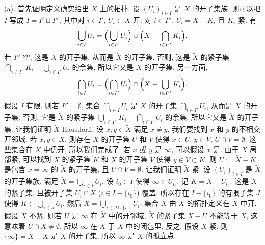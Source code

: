 \begin{exercise}[$\mathcal{C}(X)$ 的谱]
\begin{solution}
(a). 首先证明定义确实给出 $\tilde{X}$ 上的拓扑. 设 $(U_i)_{i \in I}$ 是 $\tilde{X}$ 的开子集族. 则可以把 $I$ 写成 $I = I' \sqcup I''$, 其中对 $i \in I'$, $U_i \subset X$ 开; 对 $i \in I''$, $U_i = X - K_i$ 且 $K_i$ 紧. 有
\[
\bigcup_{i \in I}U_i = \Bigl(\bigcup_{i \in I'}U_i\Bigr) \cup \Bigl(X - \bigcap_{i \in I''}K_i\Bigr).
\]
若 $I''$ 空, 这是 $X$ 的开子集, 从而是 $\tilde{X}$ 的开子集. 否则, 这是 $\tilde{X}$ 的紧子集 $\bigcap_{i \in I''}K_i - \bigcup_{i \in I'}U_i$ 的余集, 所以它又是 $\tilde{X}$ 的开子集. 另一方面,
\[
\bigcap_{i \in I}U_i = \Bigl(\bigcap_{i \in I'}U_i\Bigr) \cap \Bigl(X - \bigcup_{i \in I''}K_i\Bigr).
\]
假设 $I$ 有限. 则若 $I'' = \emptyset$, 集合 $\bigcap_{i \in I}U_i$ 是 $X$ 的开子集 $\bigcap_{i \in I'}U_i$, 从而是 $\tilde{X}$ 的开子集. 否则, 它是 $\tilde{X}$ 的紧子集 $\bigcup_{i \in I''}K_i - \bigcap_{i \in I'}U_i$ 的余集, 所以它又是 $\tilde{X}$ 的开子集.
让我们证明 $\tilde{X}$ Hausdorff. 设 $x, y \in \tilde{X}$ 满足 $x \neq y$. 我们要找到 $x$ 和 $y$ 的不相交开邻域. 若 $x, y \in X$, 则存在 $X$ 的开子集 $U$ 和 $V$ 使得 $x \in U$, $y \in V$, $U \cap V = \emptyset$. 这些集合在 $\tilde{X}$ 中仍开, 所以我们完成了. 若 $x$ 或 $y$ 是 $\infty$, 可以假设 $x$ 是. 由于 $X$ 局部紧, 可以找到 $X$ 的紧子集 $K$ 和 $X$ 的开子集 $V$ 使得 $y \in V \subset K$. 则 $U := \tilde{X} - K$ 是包含 $x = \infty$ 的 $\tilde{X}$ 的开子集, 且 $U \cap V = \emptyset$.
让我们证明 $\tilde{X}$ 紧. 设 $(U_i)_{i \in I}$ 是 $\tilde{X}$ 的开子集族, 满足 $\tilde{X} = \bigcup_{i \in I}U_i$. 设 $i_0 \in I$ 使得 $\infty \in U_{i_0}$, 记 $K = X - U_{i_0}$. 这是 $X$ 的紧子集, 且被开子集 $U_i \cap X$ ($i \in I - \{i_0\}$) 覆盖. 所以存在 $I - \{i_0\}$ 的有限子集 $J$ 使得 $K \subset \bigcup_{i \in J}U_i$, 然后 $\tilde{X} = \bigcup_{i \in J \cup \{i_0\}}U_i$.
集合 $X$ 由 $\tilde{X}$ 的拓扑定义在 $\tilde{X}$ 中开.
假设 $X$ 不紧. 则若 $U$ 是 $\infty$ 在 $\tilde{X}$ 中的开邻域, $\tilde{X}$ 的紧子集 $X - U$ 不能等于 $X$, 这意味着 $U \cap X \neq \emptyset$. 所以 $\infty$ 在 $X$ 于 $\tilde{X}$ 中的闭包里. 反之, 假设 $X$ 紧. 则 $\{\infty\} = \tilde{X} - X$ 是 $\tilde{X}$ 的开子集, 所以 $\infty$ 是 $\tilde{X}$ 的孤立点.


\end{solution}
\end{exercise}
